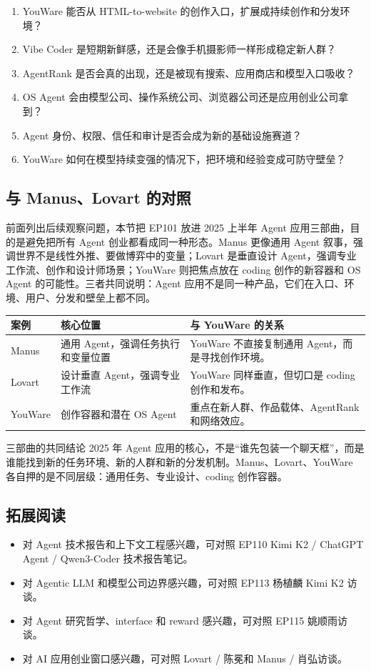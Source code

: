 \begin{enumerate}
\item YouWare 能否从 HTML-to-website 的创作入口，扩展成持续创作和分发环境？
\item Vibe Coder 是短期新鲜感，还是会像手机摄影师一样形成稳定新人群？
\item AgentRank 是否会真的出现，还是被现有搜索、应用商店和模型入口吸收？
\item OS Agent 会由模型公司、操作系统公司、浏览器公司还是应用创业公司拿到？
\item Agent 身份、权限、信任和审计是否会成为新的基础设施赛道？
\item YouWare 如何在模型持续变强的情况下，把环境和经验变成可防守壁垒？
\end{enumerate}

\subsection{与 Manus、Lovart 的对照}

前面列出后续观察问题，本节把 EP101 放进 2025 上半年 Agent 应用三部曲，目的是避免把所有 Agent 创业都看成同一种形态。Manus 更像通用 Agent 叙事，强调世界不是线性外推、要做博弈中的变量；Lovart 是垂直设计 Agent，强调专业工作流、创作和设计师场景；YouWare 则把焦点放在 coding 创作的新容器和 OS Agent 的可能性。三者共同说明：Agent 应用不是同一种产品，它们在入口、环境、用户、分发和壁垒上都不同。

\noindent\begin{tabularx}{\textwidth}{p{}p{}X}
\toprule
案例 & 核心位置 & 与 YouWare 的关系 \\
\midrule
Manus & 通用 Agent，强调任务执行和变量位置 & YouWare 不直接复制通用 Agent，而是寻找创作环境。 \\
Lovart & 设计垂直 Agent，强调专业工作流 & YouWare 同样垂直，但切口是 coding 创作和发布。 \\
YouWare & 创作容器和潜在 OS Agent & 重点在新人群、作品载体、AgentRank 和网络效应。 \\
\bottomrule
\end{tabularx}

\begin{importantbox}{三部曲的共同结论}
2025 年 Agent 应用的核心，不是“谁先包装一个聊天框”，而是谁能找到新的任务环境、新的人群和新的分发机制。Manus、Lovart、YouWare 各自押的是不同层级：通用任务、专业设计、coding 创作容器。
\end{importantbox}

\subsection{拓展阅读}

\begin{itemize}
\item 对 Agent 技术报告和上下文工程感兴趣，可对照 EP110 Kimi K2 / ChatGPT Agent / Qwen3-Coder 技术报告笔记。
\item 对 Agentic LLM 和模型公司边界感兴趣，可对照 EP113 杨植麟 Kimi K2 访谈。
\item 对 Agent 研究哲学、interface 和 reward 感兴趣，可对照 EP115 姚顺雨访谈。
\item 对 AI 应用创业窗口感兴趣，可对照 Lovart / 陈冕和 Manus / 肖弘访谈。
\end{itemize}


